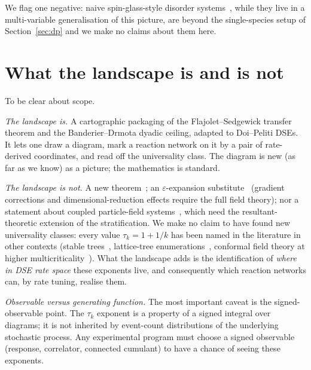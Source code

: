 \documentclass[11pt,a4paper]{article}
\theoremstyle{plain}
\theoremstyle{remark}
\begin{document}
We flag one negative: naive spin-glass-style disorder
systems~\citep{MezardParisiVirasoro1987}, while they live in a
multi-variable generalisation of this picture, are beyond the
single-species setup of Section~\ref{sec:dp} and we make no
claims about them here.

\section{What the landscape is and is not}
\label{sec:caveats}

To be clear about scope.

\emph{The landscape is.}  A cartographic packaging of the
Flajolet--Sedgewick transfer theorem and the
Banderier--Drmota dyadic ceiling, adapted to Doi--Peliti DSEs.
It lets one draw a diagram, mark a reaction network on it by a
pair of rate-derived coordinates, and read off the
universality class.  The diagram is new (as far as we know) as
a picture; the mathematics is standard.

\emph{The landscape is not.}  A new
theorem~\citep{FlajoletSedgewick,BanderierDrmota2015}; an
$\varepsilon$-expansion substitute~\citep{Tauber,Odor2004}
(gradient corrections and dimensional-reduction effects require
the full field theory); nor a statement about coupled
particle-field systems~\citep{Bothe2023}, which need the
resultant-theoretic extension of the stratification.  We make
no claim to have found new universality classes: every value
$\tau_{k} = 1+1/k$ has been named in the literature in other
contexts (stable trees~\citep{DuquesneLeGall2002,Janson2012},
lattice-tree enumerations~\citep{Parisi1981,BrydgesImbrie2003},
conformal field theory at higher
multicriticality~\citep{MussardoBook}).  What the landscape
adds is the identification of \emph{where in DSE rate space}
these exponents live, and consequently which reaction
networks can, by rate tuning, realise them.

\emph{Observable versus generating function.}  The most
important caveat is the signed-observable point.  The
$\tau_{k}$ exponent is a property of a signed integral
over diagrams; it is not inherited by event-count
distributions of the underlying stochastic process.  Any
experimental program must choose a signed observable
(response, correlator, connected cumulant) to have a chance
of seeing these exponents.

\end{document}
